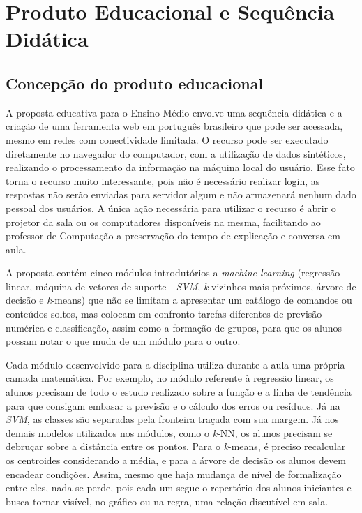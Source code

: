 \chapter{Produto Educacional e Sequência Didática}

\section{Concepção do produto educacional}

A proposta educativa para o Ensino Médio envolve uma sequência didática e a criação de uma ferramenta web em português brasileiro que pode ser acessada, mesmo em redes com conectividade limitada. O recurso pode ser executado diretamente no navegador do computador, com a utilização de dados sintéticos, realizando o processamento da informação na máquina local do usuário. Esse fato torna o recurso muito interessante, pois não é necessário realizar login, as respostas não serão enviadas para servidor algum e não armazenará nenhum dado pessoal dos usuários. A única ação necessária para utilizar o recurso é abrir o projetor da sala ou os computadores disponíveis na mesma, facilitando ao professor de Computação a preservação do tempo de explicação e conversa em aula.

A proposta contém cinco módulos introdutórios a \textit{machine learning} (regressão linear, máquina de vetores de suporte - \textit{SVM}, \textit{k}-vizinhos mais próximos, árvore de decisão e \textit{k}-means) que não se limitam a apresentar um catálogo de comandos ou conteúdos soltos, mas colocam em confronto tarefas diferentes de previsão numérica e classificação, assim como a formação de grupos, para que os alunos possam notar o que muda de um módulo para o outro.

Cada módulo desenvolvido para a disciplina utiliza durante a aula uma própria camada matemática. Por exemplo, no módulo referente à regressão linear, os alunos precisam de todo o estudo realizado sobre a função e a linha de tendência para que consigam embasar a previsão e o cálculo dos erros ou resíduos. Já na \textit{SVM}, as classes são separadas pela fronteira traçada com sua margem. Já nos demais modelos utilizados nos módulos, como o \textit{k}-NN, os alunos precisam se debruçar sobre a distância entre os pontos. Para o \textit{k}-means, é preciso recalcular os centroides considerando a média, e para a árvore de decisão os alunos devem encadear condições. Assim, mesmo que haja mudança de nível de formalização entre eles, nada se perde, pois cada um segue o repertório dos alunos iniciantes e busca tornar visível, no gráfico ou na regra, uma relação discutível em sala.

